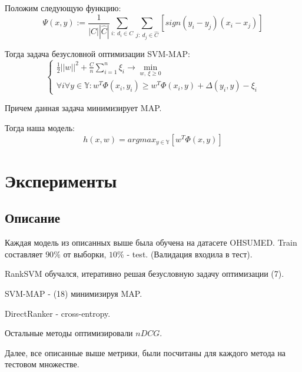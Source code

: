 \documentclass{article}[16pt]
\begin{document}
	Положим следующую функцию:
	\begin{equation}
		\Psi(x, y) := \frac1{|C||\hat{C}|} \sum_{i:~d_i \in C} \sum_{j: ~d_j \in \hat{C}} [
			sign (y_i - y_j) (x_{i}- x_j)
		]
	\end{equation}
	
	Тогда задача безусловной оптимизации SVM-MAP:
	\begin{equation}
		\begin{cases}	
			\frac12 ||w||^2 + \frac{C}{n}\sum_{i=1}^n \xi_i \rightarrow \min_{w, ~\xi \ge 0} \\
			\forall i \forall y \in \mathbb{Y}:
			w^T\Phi(x_i, y_i) \ge w^T\Phi(x_i, y) + \Delta(y_i, y) - \xi_i
		\end{cases}
	\end{equation}
	
	Причем данная задача минимизирует MAP. 
	
	Тогда наша модель:
	\begin{equation}
		h(x, w) = argmax_{y \in \mathbb{Y}} [w^T\Phi(x, y)]
	\end{equation}

	\section{Эксперименты}
	\subsection{Описание}
	Каждая модель из описанных выше была обучена на датасете OHSUMED. Train составляет $90\%$ от выборки, $10\%$ - test. (Валидация входила в тест).
	
	RankSVM обучался, итеративно решая безусловную задачу оптимизации (7). 
	
	SVM-MAP - (18) минимизируя MAP.
	
	DirectRanker - cross-entropy.
	
	Остальные методы оптимизировали $nDCG$.
	
	Далее, все описанные выше метрики, были посчитаны для каждого метода на тестовом множестве.
	
\end{document}
